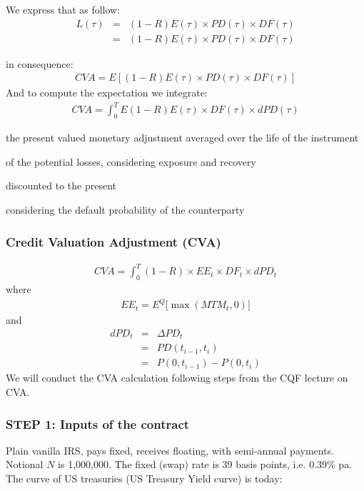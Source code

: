 \documentclass[11pt]{article}
\numberwithin{equation}{subsection}
\begin{document}
\noindent We express that as follow:
\begin{eqnarray}
L(\tau)&=&(1-R)E(\tau) \times PD(\tau) \times DF(\tau)\\
&=&(1-R)E(\tau) \times PD(\tau) \times DF(\tau)
\end{eqnarray}
	
\noindent in consequence:
\begin{eqnarray}
CVA = E[(1-R)E(\tau) \times PD(\tau) \times DF(\tau)]
\end{eqnarray}
And to compute the expectation we integrate:
\begin{eqnarray}
CVA = \int_{0}^{T} E(1-R)E(\tau) \times DF(\tau) \times dPD(\tau)
\end{eqnarray}


the present valued monetary adjustment
averaged over the life of the instrument

of the potential losses, considering exposure and recovery

discounted to the present 

considering the default probability of the counterparty

\subsubsection{Credit Valuation Adjustment (CVA)}

\begin{eqnarray}
CVA = \int_{0}^{T} (1-R) \times EE_{t} \times DF_{t}  \times  dPD_{t}
\end{eqnarray}
where 
\begin{eqnarray}
EE_{t} = E^{Q} \big[\max(MTM_{t},0)\big]
\end{eqnarray}
and 
\begin{eqnarray}
dPD_{t}&=&\Delta PD_{t}\\
&=&PD(t_{i-1}, t_{i})\\
&=&P(0, t_{i-1}) - P(0, t_{i})
\end{eqnarray}
We will conduct the CVA calculation following steps from the CQF lecture on CVA.

\subsubsection{STEP 1: Inputs of the contract}
Plain vanilla IRS, pays fixed, receives floating, with semi-annual payments. Notional \(N\) is 1,000,000. 
The fixed (swap) rate is 39 basis points, i.e. 0.39\% pa. The curve of US treasuries (US Treasury Yield curve) is today:
\end{document}
